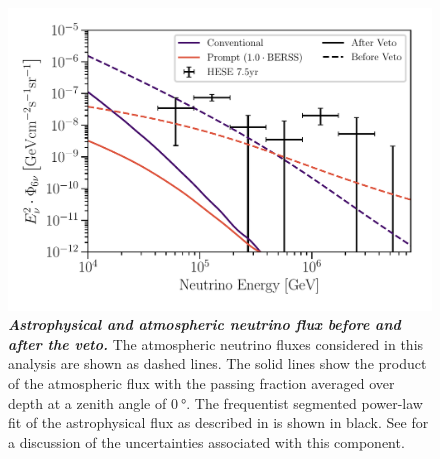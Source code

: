 \begin{figure}
	\centering
	\includegraphics[width=\linewidth]{figures/hese_paper/neutrino_spectrum}
	\internallinenumbers
	\caption{\textbf{\textit{Astrophysical and atmospheric neutrino flux before and after the veto.}} The atmospheric neutrino fluxes considered in this analysis are shown as dashed lines.
		The solid lines show the product of the atmospheric flux with the passing fraction averaged over depth at a zenith angle of $\SI{0}\degree$.
		The frequentist segmented power-law fit of the astrophysical flux as described in  is shown in black.
		See  for a discussion of the uncertainties associated with this component.}
	\label{fig:neutrino_spectrum}
\end{figure}

